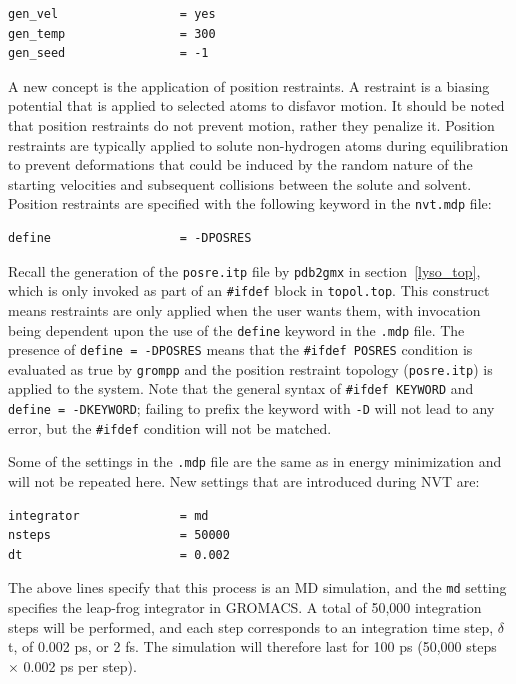 \documentclass[9pt,tutorial]{livecoms}
\begin{document}
\begin{verbatim}
gen_vel                 = yes
gen_temp                = 300
gen_seed                = -1
\end{verbatim}

A new concept is the application of position restraints. A restraint is a biasing potential that is applied to selected atoms to disfavor motion. It should be noted that position restraints do not prevent motion, rather they penalize it. Position restraints are typically applied to solute non-hydrogen atoms during equilibration to prevent deformations that could be induced by the random nature of the starting velocities and subsequent collisions between the solute and solvent. Position restraints are specified with the following keyword in the \texttt{nvt.mdp} file:

\begin{verbatim}
define                  = -DPOSRES
\end{verbatim}

Recall the generation of the \texttt{posre.itp} file by \texttt{pdb2gmx} in section~\ref{lyso_top}, which is only invoked as part of an \texttt{\#ifdef} block in \texttt{topol.top}. This construct means restraints are only applied when the user wants them, with invocation being dependent upon the use of the \texttt{define} keyword in the \texttt{.mdp} file. The presence of \texttt{define = -DPOSRES} means that the \texttt{\#ifdef POSRES} condition is evaluated as true by \texttt{grompp} and the position restraint topology (\texttt{posre.itp}) is applied to the system. Note that the general syntax of \texttt{\#ifdef KEYWORD} and \texttt{define = -DKEYWORD}; failing to prefix the keyword with \texttt{-D} will not lead to any error, but the \texttt{\#ifdef} condition will not be matched.

Some of the settings in the \texttt{.mdp} file are the same as in energy minimization and will not be repeated here. New settings that are introduced during NVT are:

\begin{verbatim}
integrator              = md
nsteps                  = 50000
dt                      = 0.002
\end{verbatim}

The above lines specify that this process is an MD simulation, and the \texttt{md} setting specifies the leap-frog integrator in GROMACS. A total of 50,000 integration steps will be performed, and each step corresponds to an integration time step, $\delta$t, of 0.002 ps, or 2 fs. The simulation will therefore last for 100 ps (50,000 steps $\times$ 0.002 ps per step).
\end{document}

